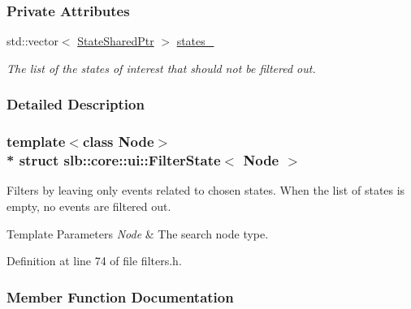 \subsubsection*{Private Attributes}
\begin{DoxyCompactItemize}
\item 
std\+::vector$<$ \hyperlink{structslb_1_1core_1_1ui_1_1FilterState_a832a02468e2d15393c1937a33988073b}{State\+Shared\+Ptr} $>$ \hyperlink{structslb_1_1core_1_1ui_1_1FilterState_a4a0d6995c62160fb54b0adbb8ac9f366}{states\+\_\+}\hypertarget{structslb_1_1core_1_1ui_1_1FilterState_a4a0d6995c62160fb54b0adbb8ac9f366}{}\label{structslb_1_1core_1_1ui_1_1FilterState_a4a0d6995c62160fb54b0adbb8ac9f366}

\begin{DoxyCompactList}\small\item\em The list of the states of interest that should not be filtered out. \end{DoxyCompactList}\end{DoxyCompactItemize}


\subsubsection{Detailed Description}
\subsubsection*{template$<$class Node$>$\\*
struct slb\+::core\+::ui\+::\+Filter\+State$<$ Node $>$}

Filters by leaving only events related to chosen states. When the list of states is empty, no events are filtered out. 


\begin{DoxyTemplParams}{Template Parameters}
{\em Node} & The search node type. \\
\hline
\end{DoxyTemplParams}


Definition at line 74 of file filters.\+h.



\subsubsection{Member Function Documentation}
